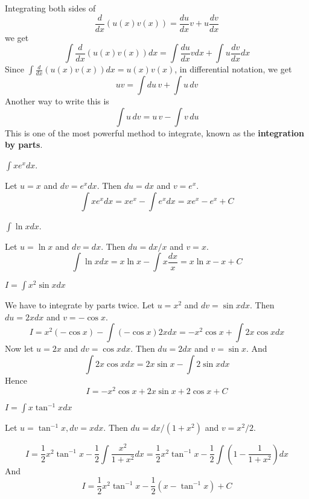 \documentclass[../calc1-main.tex]{subfiles}
\begin{document}
Integrating both sides of
\[
	\frac{d}{dx} (u(x) v(x)) = \frac{du}{dx} v + u \frac{dv}{dx}
\]
we get
\[
	\int \frac{d}{dx} (u(x) v(x)) dx = \int \frac{du}{dx} v dx + \int u \frac{dv}{dx} dx
\]
Since $\int \frac{d}{dx} (u(x) v(x)) dx = u(x) v(x)$, in differential notation, we get
\[
	u v = \int du \, v + \int u \, dv
\]
Another way to write this is
\[
	\int u \, dv = u\, v - \int v \, du
\]
This is one of the most powerful method to integrate, known as the \textbf{integration by parts}.

\begin{example}
	$\displaystyle \int x e^x dx$.
\end{example}
\begin{solution}
	Let $u = x$ and $dv = e^x dx$. Then $du = dx$ and $v = e^x$.
	\[
		\int x e^x dx = x e^x - \int e^x dx = x e^x - e^x + C
	\]
\end{solution}

\begin{example}
	$\displaystyle \int \ln x dx$.
\end{example}
\begin{solution}
	Let $u = \ln x$ and $dv = dx$. Then $du = dx/x$ and $v = x$.
	\[
		\int \ln x dx = x \ln x - \int x \frac{dx}{x} = x \ln x - x + C
	\]
\end{solution}

\begin{example}
	$I=\displaystyle \int x^2 \sin x dx$
\end{example}
\begin{solution}
	We have to integrate by parts twice. Let $u = x^2$ and $dv = \sin x dx$. Then $du = 2x dx$ and $v = -\cos x$.
	\[
		I = x^2 (-\cos x) - \int (-\cos x) 2x dx = - x^2 \cos x + \int 2x \cos x dx
	\]
	Now let $u = 2x$ and $dv = \cos x dx$. Then $du = 2 dx$ and $v = \sin x$. And
	\[
		\int 2x \cos x dx = 2x \sin x - \int 2 \sin x dx
	\]
	Hence
	\[
		I = -x^2 \cos x + 2x \sin x +2 \cos x + C
	\]
\end{solution}

\begin{example}
	$I = \displaystyle \int x \tan^{-1} x dx$
\end{example}
\begin{solution}
	Let $u=\tan^{-1}x, dv = x dx$. Then $du = dx/(1+x^2)$ and $v = x^2/2$.

	\[
		I = \frac{1}{2} x^2 \tan^{-1}x -\frac{1}{2} \int \frac{x^2}{1+x^2} dx
		= \frac{1}{2} x^2 \tan^{-1}x -\frac{1}{2} \int \left( 1- \frac{1}{1+x^2} \right) dx
	\]
	And
	\[
		I = \frac{1}{2} x^2 \tan^{-1}x - \frac{1}{2} (x - \tan^{-1}x) + C
	\]
\end{solution}
\end{document}

